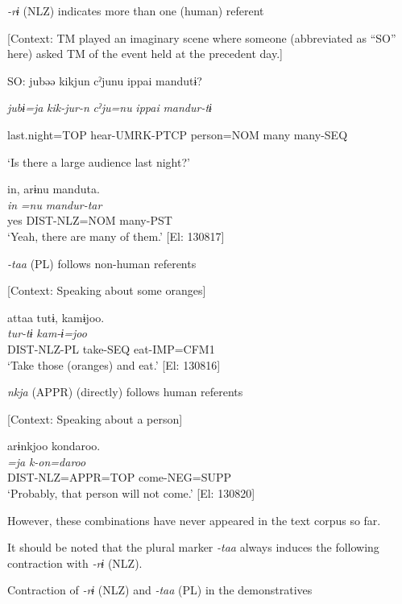 \ea \label{ex:5:17}  \ea \label{ex:5:17a} \textit{{}-rɨ} (NLZ) indicates more than one (human) referent

    [Context: TM played an imaginary scene where someone (abbreviated as “SO” here) asked TM of the event held at the precedent day.]

    SO:  jubəə  kikjun  cˀjunu  ippai  mandutɨ?

      \textit{jubɨ=ja}  \textit{kik-jur-n}  \textit{cˀju=nu}  \textit{ippai}  \textit{mandur-tɨ}

      last.night=TOP  hear-UMRK-PTCP  person=NOM  many  many-SEQ

      ‘Is there a large audience last night?’

\glll  in,  arɨnu  manduta.\\
\textit{in}  \textit{=nu}  \textit{mandur-tar}\\
yes  DIST-NLZ=NOM  many-PST\\
\glt ‘Yeah, there are many of them.’ [El: 130817]

 \ex \label{ex:5:b} \textit{{}-taa} (PL) follows non-human referents

    [Context: Speaking about some oranges]

\glll  attaa  tutɨ,  kamɨjoo.\\
\textit{}  \textit{tur-tɨ}  \textit{kam-ɨ=joo}\\
DIST-NLZ-PL  take-SEQ  eat-IMP=CFM1\\
\glt ‘Take those (oranges) and eat.’ [El: 130816]

 \ex \label{ex:5:c} \textit{nkja} (APPR) (directly) follows human referents

    [Context: Speaking about a person]

\glll  arɨnkjoo  kondaroo.\\
\textit{=ja}  \textit{k-on=daroo}\\
DIST-NLZ=APPR=TOP  come-NEG=SUPP\\
\glt ‘Probably, that person will not come.’ [El: 130820]
\z
\z

However, these combinations have never appeared in the text corpus so far.

It should be noted that the plural marker \textit{{}-taa} always induces the following contraction with \textit{{}-rɨ} (NLZ).

\ea \label{ex:5:18}   Contraction of \textit{{}-rɨ} (NLZ) and \textit{{}-taa} (PL) in the demonstratives

